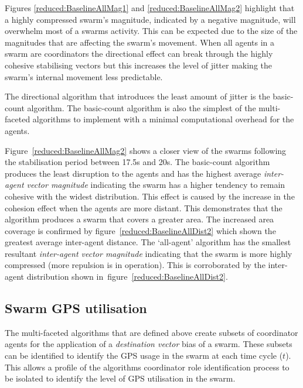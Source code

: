 Figures \ref{reduced:BaselineAllMag1} and \ref{reduced:BaselineAllMag2} highlight that a highly compressed swarm's magnitude, indicated by a negative magnitude, will overwhelm most of a swarms activity. This can be expected due to the size of the magnitudes that are affecting the swarm's movement. When all agents in a swarm are coordinators the directional effect can break through the highly cohesive stabilising vectors but this increases the level of jitter making the swarm's internal movement less predictable.

The directional algorithm that introduces the least amount of jitter is the basic-count algorithm. The basic-count algorithm is also the simplest of the multi-faceted algorithms to implement with a minimal computational overhead for the agents. 

Figure~\ref{reduced:BaselineAllMag2} shows a closer view of the swarms following the stabilisation period between 17.5s and 20s. The basic-count algorithm produces the least disruption to the agents and has the highest average \textit{inter-agent vector magnitude} indicating the swarm has a higher tendency to remain cohesive with the widest distribution. This effect is caused by the increase in the cohesion effect when the agents are more distant. This demonstrates that the algorithm produces a swarm that covers a greater area. The increased area coverage is confirmed by figure~\ref{reduced:BaselineAllDist2} which shown the greatest average inter-agent distance. The `all-agent' algorithm has the smallest resultant \textit{inter-agent vector magnitude} indicating that the swarm is more highly compressed (more repulsion is in operation). This is corroborated by the inter-agent distribution shown in~figure~\ref{reduced:BaselineAllDist2}.

\subsection{Swarm GPS utilisation\label{section:compareGPSUages1}}
The multi-faceted algorithms that are defined above create subsets of coordinator agents for the application of a \textit{destination vector} bias of a swarm. These subsets can be identified to identify the GPS usage in the swarm at each time cycle ($t$). This allows a profile of the algorithms coordinator role identification process to be isolated to identify the level of GPS utilisation in the swarm.

